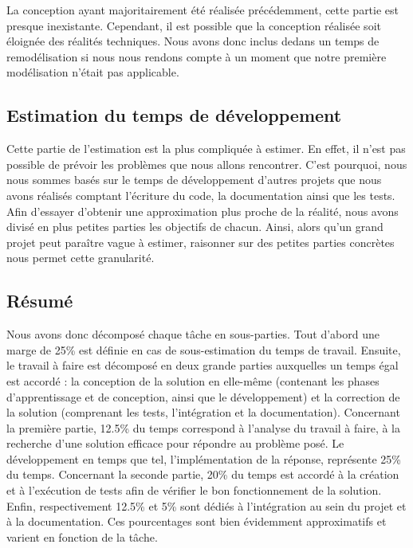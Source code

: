 La conception ayant majoritairement été réalisée précédemment, cette partie est presque inexistante. Cependant, il est possible que la conception réalisée soit éloignée des réalités techniques. Nous avons donc inclus dedans un temps de remodélisation si nous nous rendons compte à un moment que notre première modélisation n’était pas applicable.

\subsection{Estimation du temps de développement}

Cette partie de l’estimation est la plus compliquée à estimer. En effet, il n’est pas possible de prévoir les problèmes que nous allons rencontrer. C’est pourquoi, nous nous sommes basés sur le temps de développement d’autres projets que nous avons réalisés comptant l’écriture du code, la documentation ainsi que les tests. Afin d’essayer d’obtenir une approximation plus proche de la réalité, nous avons divisé en plus petites parties les objectifs de chacun. Ainsi, alors qu’un grand projet peut paraître vague à estimer, raisonner sur des petites parties concrètes nous permet cette granularité.

\subsection{Résumé}

Nous avons donc décomposé chaque tâche en sous-parties. Tout d’abord une marge de 25\% est définie en cas de sous-estimation du temps de travail. Ensuite, le travail à faire est décomposé en deux grande parties auxquelles un temps égal est accordé : la conception de la solution en elle-même (contenant les phases d’apprentissage et de conception, ainsi que le développement) et la correction de la solution (comprenant les tests, l’intégration et la documentation). Concernant la première partie, 12.5\% du temps correspond à l’analyse du travail à faire, à la recherche d’une solution efficace pour répondre au problème posé. Le développement en temps que tel, l’implémentation de la réponse, représente 25\% du temps. Concernant la seconde partie, 20\% du temps est accordé à la création et à l’exécution de tests afin de vérifier le bon fonctionnement de la solution. Enfin, respectivement 12.5\% et 5\% sont dédiés à l’intégration au sein du projet et à la documentation. Ces pourcentages sont bien évidemment approximatifs et varient en fonction de la tâche.


